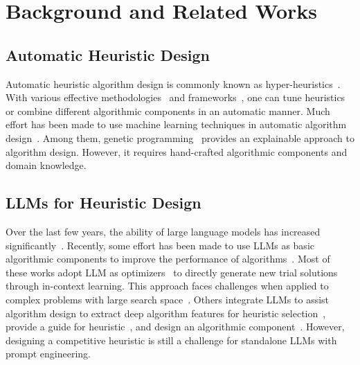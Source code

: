 \section{Background and Related Works}\label{sec:related}

\subsection{Automatic Heuristic Design}
Automatic heuristic algorithm design is commonly known as hyper-heuristics~\cite{burke2013hyper,burke2019classification,stutzle2019automated}. With various effective methodologies~\cite{blot2016mo,lopez2016irace,akiba2019optuna} and frameworks~\cite{burke2019classification}, one can tune heuristics or combine different algorithmic components in an automatic manner. Much effort has been made to use machine learning techniques in automatic algorithm design~\cite{bengio2021machine,chen2022learning,he2021automl,li2023survey}. Among them, genetic programming~\cite{mei2022explainable,jia2022learning} provides an explainable approach to algorithm design. However, it requires hand-crafted algorithmic components and domain knowledge.

\subsection{LLMs for Heuristic Design}
Over the last few years, the ability of large language models has increased significantly~\cite{naveed2023comprehensive}. Recently, some effort has been made to use LLMs as basic algorithmic components to improve the performance of algorithms~\cite{yang2023large,guo2023towards}. Most of these works adopt LLM as optimizers~\cite{yang2023large} to directly generate new trial solutions through in-context learning. This approach faces challenges when applied to complex problems with large search space~\cite{yang2023large,nasir2023llmatic,zhao2023large,liu2023large}. Others integrate LLMs to assist algorithm design to extract deep algorithm features for heuristic selection~\cite{wu2023llm}, provide a guide for heuristic~\cite{shah2023navigation}, and design an algorithmic component~\cite{xiao2023llm}.  However, designing a competitive heuristic is still a challenge for standalone LLMs with prompt engineering.

